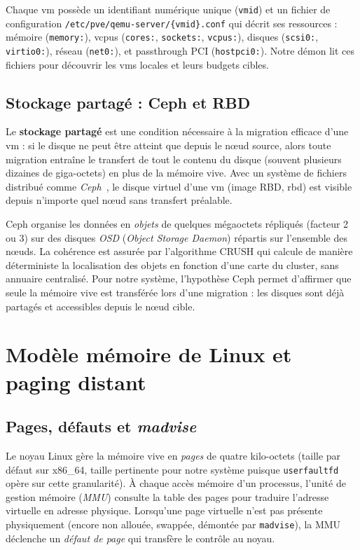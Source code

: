Chaque \acrshort{vm} possède un identifiant numérique unique (\texttt{vmid}) et un fichier de configuration \texttt{/etc/pve/qemu-server/\{vmid\}.conf} qui décrit ses ressources : mémoire (\texttt{memory:}), \acrshort{vcpu}s (\texttt{cores:}, \texttt{sockets:}, \texttt{vcpus:}), disques (\texttt{scsi0:}, \texttt{virtio0:}), réseau (\texttt{net0:}), et passthrough PCI (\texttt{hostpci0:}). Notre démon lit ces fichiers pour découvrir les \acrshort{vm}s locales et leurs budgets cibles.

\subsection{Stockage partagé : Ceph et RBD}

Le \textbf{stockage partagé} est une condition nécessaire à la migration efficace d'une \acrshort{vm} : si le disque ne peut être atteint que depuis le nœud source, alors toute migration entraîne le transfert de tout le contenu du disque (souvent plusieurs dizaines de giga-octets) en plus de la mémoire vive. Avec un système de fichiers distribué comme \emph{Ceph}~\cite{ceph_doc}, le disque virtuel d'une \acrshort{vm} (image RBD, \acrshort{rbd}) est visible depuis n'importe quel nœud sans transfert préalable.

Ceph organise les données en \emph{objets} de quelques mégaoctets répliqués (facteur 2 ou 3) sur des disques \emph{OSD} (\emph{Object Storage Daemon}) répartis sur l'ensemble des nœuds. La cohérence est assurée par l'algorithme CRUSH qui calcule de manière déterministe la localisation des objets en fonction d'une carte du cluster, sans annuaire centralisé. Pour notre système, l'hypothèse Ceph permet d'affirmer que \og{}seule la mémoire vive est transférée lors d'une migration\fg{} : les disques sont déjà partagés et accessibles depuis le nœud cible.

\section{Modèle mémoire de Linux et paging distant}
\label{sec:linux-mem}

\subsection{Pages, défauts et \emph{madvise}}

Le noyau Linux gère la mémoire vive en \emph{pages} de quatre kilo-octets (taille par défaut sur x86\_64, taille pertinente pour notre système puisque \texttt{userfaultfd} opère sur cette granularité). À chaque accès mémoire d'un processus, l'unité de gestion mémoire (\emph{MMU}) consulte la table des pages pour traduire l'adresse virtuelle en adresse physique. Lorsqu'une page virtuelle n'est pas présente physiquement (encore non allouée, swappée, démontée par \texttt{madvise}), la MMU déclenche un \emph{défaut de page} qui transfère le contrôle au noyau.

